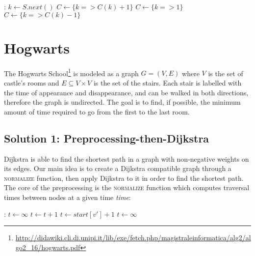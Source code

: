 \documentclass{article}
\begin{document}
\begin{algorithmic}[1]
  :
    \State $k \gets S.next()$\;
        \State $C \gets \{k => C(k) + 1\}$\;    
        \State $C \gets \{k => 1\}$\;           
    \Else
        \State $C \gets \{k => C(k) - 1\}$      
    \EndIf
    \State {}\;
    \EndFunction
\end{algorithmic}

\newpage
\newpage
\section{Hogwarts}

The Hogwarts School\footnote{\url{http://didawiki.cli.di.unipi.it/lib/exe/fetch.php/magistraleinformatica/alg2/algo2_16/hogwarts.pdf}}
is modeled as a graph $G=(V, E)$ where $V$ is the set of castle's rooms and $E \subseteq V \times V$
is the set of the stairs.
Each stair is labelled with the time of appearance and disappearance, and can be
walked in both directions, therefore the graph is undirected.
The goal is to find, if possible, the minimum amount of time required to go from
the first to the last room.

\subsection{Solution 1: Preprocessing-then-Dijkstra}

Dijkstra is able to find the shortest path in a graph with non-negative weights
on its edges.
Our main idea is to create a Dijkstra compatible graph through a \textsc{normalize}
function, then apply Dijkstra to it in order to find the shortest path.
The core of the preprocessing is the \textsc{normalize} function which computes traversal
times between nodes at a given time \emph{time}:

\begin{algorithmic}[1]
  :
    \State $t \gets \infty$
      
      \State $t \gets t + 1$
                
      \State $t \gets start[v'] + 1$
    \Else
      \State $t \gets \infty$          
    \EndIf
      \State {}
    \EndFunction
\end{algorithmic}
\end{document}
